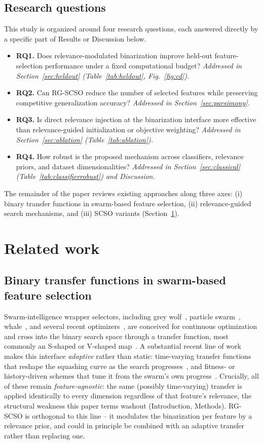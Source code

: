 \documentclass[preprint,3p,times]{elsarticle}
\begin{document}
\subsection{Research questions}
This study is organized around four research questions, each answered
directly by a specific part of Results or Discussion below.
\begin{itemize}
\item \textbf{RQ1.} Does relevance-modulated binarization improve held-out
  feature-selection performance under a fixed computational budget?
  \emph{Addressed in Section~\ref{sec:heldout} (Table~\ref{tab:heldout},
  Fig.~\ref{fig:cd}).}
\item \textbf{RQ2.} Can RG-SCSO reduce the number of selected features while
  preserving competitive generalization accuracy?
  \emph{Addressed in Section~\ref{sec:parsimony}.}
\item \textbf{RQ3.} Is direct relevance injection at the binarization
  interface more effective than relevance-guided initialization or
  objective weighting?
  \emph{Addressed in Section~\ref{sec:ablation} (Table~\ref{tab:ablation}).}
\item \textbf{RQ4.} How robust is the proposed mechanism across
  classifiers, relevance priors, and dataset dimensionalities?
  \emph{Addressed in Section~\ref{sec:classical}
  (Table~\ref{tab:classifierrobust}) and Discussion.}
\end{itemize}

The remainder of the paper reviews existing approaches along three axes: (i)
binary transfer functions in swarm-based feature selection, (ii)
relevance-guided search mechanisms, and (iii) SCSO variants
(Section~\ref{sec:relwork}).

\FloatBarrier
\section{Related work}
\label{sec:relwork}
\subsection{Binary transfer functions in swarm-based feature selection}
Swarm-intelligence wrapper selectors, including grey wolf~\cite{bgwo},
particle swarm~\cite{pso}, whale~\cite{mafarja}, and several recent
optimizers~\cite{aoa,coa,rime}, are conceived for continuous optimization
and cross into the binary search space through a transfer function, most
commonly an S-shaped or V-shaped map~\cite{tf}. A substantial recent line of
work makes this interface \emph{adaptive} rather than static: time-varying
transfer functions that reshape the squashing curve as the search
progresses~\cite{islam2017tvtf,bgoatvg2024}, and fitness- or history-driven
schemes that tune it from the swarm's own progress~\cite{teng2017avbpso,fhsbpso2024}.
Crucially, all of these remain \emph{feature-agnostic}: the same (possibly
time-varying) transfer is applied identically to every dimension regardless
of that feature's relevance, the structural weakness this paper terms washout
(Introduction, Methods). RG-SCSO is orthogonal to this line -- it modulates
the binarization per feature by a relevance prior, and could in principle be
combined with an adaptive transfer rather than replacing one.
\end{document}
